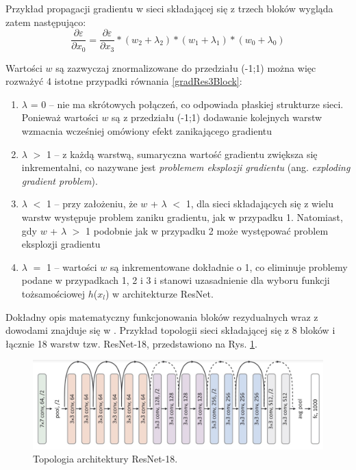 Przykład propagacji gradientu w sieci składającej się z trzech bloków wygląda zatem następująco:
\begin{equation}
\label{gradRes3Block}
\frac{\partial \varepsilon}{\partial x_0} =  \frac{\partial \varepsilon}{\partial x_3}*(w_2+\lambda_2)*(w_1+\lambda_1)*(w_0+\lambda_0)
\end{equation}

Wartości $w$ są zazwyczaj znormalizowane do przedziału (-1;1) można więc rozważyć 4 istotne przypadki równania \ref{gradRes3Block}:
\begin{enumerate}
	\item $\lambda$ = 0 -- nie ma skrótowych połączeń, co odpowiada płaskiej strukturze sieci. Ponieważ wartości $w$ są z przedziału (-1;1) dodawanie kolejnych warstw wzmacnia wcześniej omówiony efekt zanikającego gradientu
	\item $\lambda$ $>$ 1 -- z każdą warstwą, sumaryczna wartość gradientu zwiększa się inkrementalni, co nazywane jest \textit{problemem eksplozji gradientu} (ang. \textit{exploding gradient problem}).
	\item $\lambda$ $<$ 1 -- przy założeniu, że $w$ + $\lambda$ $<$ 1, dla sieci składających się z wielu warstw występuje problem zaniku gradientu, jak w przypadku 1. Natomiast, gdy $w$ + $\lambda$ $>$ 1 podobnie jak w przypadku 2 może występować problem eksplozji gradientu
	\item $\lambda$ $=$ 1 -- wartości $w$ są inkrementowane dokładnie o 1, co eliminuje problemy podane w przypadkach 1, 2 i 3 i stanowi uzasadnienie dla wyboru funkcji tożsamościowej $h$($x_l$) w architekturze ResNet.
\end{enumerate}

Dokładny opis matematyczny funkcjonowania bloków rezydualnych wraz z dowodami znajduje się w \cite{DBLP:journals/corr/HeZR016}. Przykład topologii sieci składającej się z 8 bloków i łącznie 18 warstw tzw. ResNet-18, przedstawiono na Rys. \ref{ResNetTopo}.
\begin{figure}[h!]
	\centering
	\includegraphics[width=1\textwidth]{figures/ResNet.png}
	\caption{Topologia architektury ResNet-18.}
	\label{ResNetTopo}
\end{figure} 


